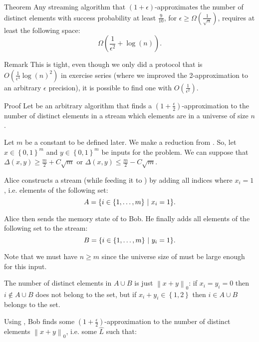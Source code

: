 \documentclass[a4paper]{article}
\begin{document}
\begin{parag}{Theorem}
    Any streaming algorithm that $\left(1+\epsilon\right)$-approximates the number of distinct elements with success probability at least $\frac{9}{10}$, for $\epsilon \geq \Omega\left(\frac{1}{\sqrt{n}}\right)$, requires at least the following space:
    \[\Omega\left(\frac{1}{\epsilon^2} + \log\left(n\right)\right).\]

    \begin{subparag}{Remark}
        This is tight, even though we only did a protocol that is $O\left(\frac{1}{\epsilon^4} \log\left(n\right)^2\right)$ in exercise series (where we improved the 2-approximation to an arbitrary $\epsilon$ precision), it is possible to find one with $O\left(\frac{1}{\epsilon^2}\right)$.
    \end{subparag}

    \begin{subparag}{Proof}
        Let  be an arbitrary algorithm that finds a $\left(1+\frac{\epsilon}{2}\right)$-approximation to the number of distinct elements in a stream which elements are in a universe of size $n$.

        Let $m$ be a constant to be defined later. We make a reduction from . So, let $x \in \left\{0, 1\right\}^m$ and $y \in \left\{0, 1\right\}^m$ be inputs for the  problem. We can suppose that $\Delta\left(x, y\right) \geq \frac{m}{2} + C\sqrt{m}$ or $\Delta\left(x, y\right) \leq \frac{m}{2} - C\sqrt{m}$.

        Alice constructs a stream (while feeding it to ) by adding all indices where $x_i = 1$, i.e. elements of the following set: 
        \[A = \left\{i \in \left\{1, \ldots, m\right\} \suchthat x_i =1\right\}.\]

        Alice then sends the memory state of  to Bob. He finally adds all elements of the following set to the stream: 
        \[B = \left\{i \in \left\{1, \ldots, m\right\} \suchthat y_i = 1\right\}.\]

        Note that we must have $n \geq m$ since the universe size of  must be large enough for this input.
        
        The number of distinct elements in $A \cup B$ is just $\left\|x + y\right\|_0$: if $x_i = y_i = 0$ then $i \notin A \cup B$ does not belong to the set, but if $x_i + y_i \in \left\{1, 2\right\}$ then $i \in A \cup B$ belongs to the set.         

        Using , Bob finds some $\left(1 +\frac{\epsilon}{2}\right)$-approximation to the number of distinct elements $\left\|x + y\right\|_0$, i.e. some $\hat{L}$ such that: 


\end{subparag}
\end{parag}
\end{document}
